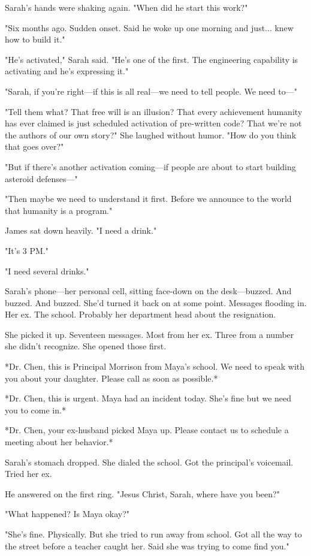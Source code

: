 Sarah's hands were shaking again. "When did he start this work?"

"Six months ago. Sudden onset. Said he woke up one morning and just... knew how to build it."

"He's activated," Sarah said. "He's one of the first. The engineering capability is activating and he's expressing it."

"Sarah, if you're right—if this is all real—we need to tell people. We need to—"

"Tell them what? That free will is an illusion? That every achievement humanity has ever claimed is just scheduled activation of pre-written code? That we're not the authors of our own story?" She laughed without humor. "How do you think that goes over?"

"But if there's another activation coming—if people are about to start building asteroid defenses—"

"Then maybe we need to understand it first. Before we announce to the world that humanity is a program."

James sat down heavily. "I need a drink."

"It's 3 PM."

"I need several drinks."

Sarah's phone—her personal cell, sitting face-down on the desk—buzzed. And buzzed. And buzzed. She'd turned it back on at some point. Messages flooding in. Her ex. The school. Probably her department head about the resignation.

She picked it up. Seventeen messages. Most from her ex. Three from a number she didn't recognize. She opened those first.

*Dr. Chen, this is Principal Morrison from Maya's school. We need to speak with you about your daughter. Please call as soon as possible.*

*Dr. Chen, this is urgent. Maya had an incident today. She's fine but we need you to come in.*

*Dr. Chen, your ex-husband picked Maya up. Please contact us to schedule a meeting about her behavior.*

Sarah's stomach dropped. She dialed the school. Got the principal's voicemail. Tried her ex.

He answered on the first ring. "Jesus Christ, Sarah, where have you been?"

"What happened? Is Maya okay?"

"She's fine. Physically. But she tried to run away from school. Got all the way to the street before a teacher caught her. Said she was trying to come find you."

